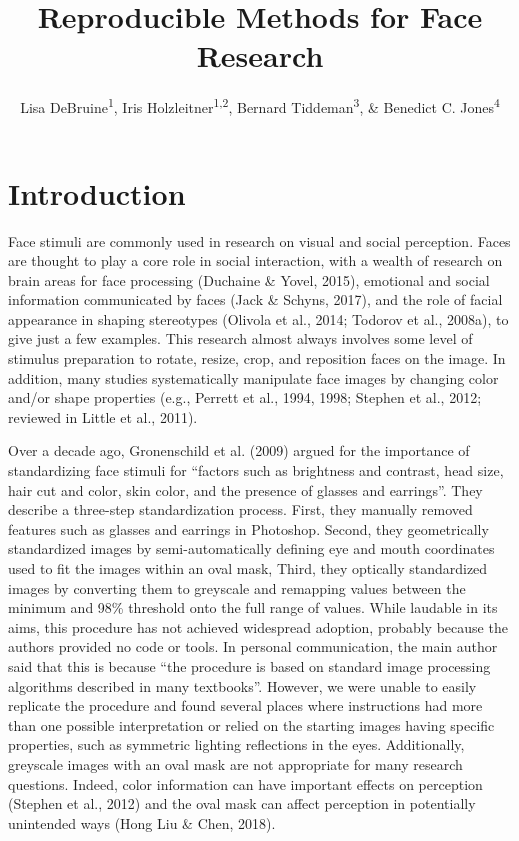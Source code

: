 \documentclass[
  man,floatsintext]{apa6}
\title{Reproducible Methods for Face Research}
\author{Lisa DeBruine\textsuperscript{1}, Iris Holzleitner\textsuperscript{1,2}, Bernard Tiddeman\textsuperscript{3}, \& Benedict C. Jones\textsuperscript{4}}
\date{}
\affiliation{\vspace{0.5cm}\textsuperscript{1} Institute of Neuroscience \& Psychology, University of Glasgow\\\textsuperscript{2} Health and Social Sciences, University of the West of England, Bristol\\\textsuperscript{3} Computer Science, Aberystwyth University\\\textsuperscript{4} Psychological Sciences \& Health, University of Strathclyde}
\begin{document}
\maketitle

{
\setcounter{tocdepth}{2}
\tableofcontents
}
\hypertarget{introduction}{%
\section{Introduction}\label{introduction}}

Face stimuli are commonly used in research on visual and social perception. Faces are thought to play a core role in social interaction, with a wealth of research on brain areas for face processing (Duchaine \& Yovel, 2015), emotional and social information communicated by faces (Jack \& Schyns, 2017), and the role of facial appearance in shaping stereotypes (Olivola et al., 2014; Todorov et al., 2008a), to give just a few examples. This research almost always involves some level of stimulus preparation to rotate, resize, crop, and reposition faces on the image. In addition, many studies systematically manipulate face images by changing color and/or shape properties (e.g., Perrett et al., 1994, 1998; Stephen et al., 2012; reviewed in Little et al., 2011).

Over a decade ago, Gronenschild et al. (2009) argued for the importance of standardizing face stimuli for ``factors such as brightness and contrast, head size, hair cut and color, skin color, and the presence of glasses and earrings''. They describe a three-step standardization process. First, they manually removed features such as glasses and earrings in Photoshop. Second, they geometrically standardized images by semi-automatically defining eye and mouth coordinates used to fit the images within an oval mask, Third, they optically standardized images by converting them to greyscale and remapping values between the minimum and 98\% threshold onto the full range of values. While laudable in its aims, this procedure has not achieved widespread adoption, probably because the authors provided no code or tools. In personal communication, the main author said that this is because ``the procedure is based on standard image processing algorithms described in many textbooks''. However, we were unable to easily replicate the procedure and found several places where instructions had more than one possible interpretation or relied on the starting images having specific properties, such as symmetric lighting reflections in the eyes. Additionally, greyscale images with an oval mask are not appropriate for many research questions. Indeed, color information can have important effects on perception (Stephen et al., 2012) and the oval mask can affect perception in potentially unintended ways (Hong Liu \& Chen, 2018).
\end{document}
